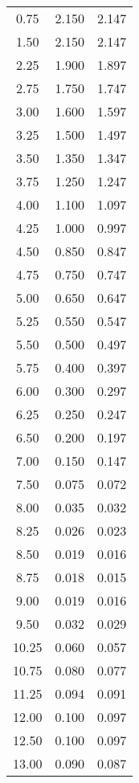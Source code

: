 \begin{tabular}{S[table-format=2.2]S[table-format=1.3]S[table-format=1.3]}
		0.75 & 2.150 & 2.147 \\
		1.50 & 2.150 & 2.147 \\
		2.25 & 1.900 & 1.897 \\
		2.75 & 1.750 & 1.747 \\
		3.00 & 1.600 & 1.597 \\
		3.25 & 1.500 & 1.497 \\
		3.50 & 1.350 & 1.347 \\
		3.75 & 1.250 & 1.247 \\
		4.00 & 1.100 & 1.097 \\
		4.25 & 1.000 & 0.997 \\
		4.50 & 0.850 & 0.847 \\
		4.75 & 0.750 & 0.747 \\
		5.00 & 0.650 & 0.647 \\
		5.25 & 0.550 & 0.547 \\
		5.50 & 0.500 & 0.497 \\
		5.75 & 0.400 & 0.397 \\
		6.00 & 0.300 & 0.297 \\
		6.25 & 0.250 & 0.247 \\
		6.50 & 0.200 & 0.197 \\
		7.00 & 0.150 & 0.147 \\
		7.50 & 0.075 & 0.072 \\
		8.00 & 0.035 & 0.032 \\
		8.25 & 0.026 & 0.023 \\
		8.50 & 0.019 & 0.016 \\
		8.75 & 0.018 & 0.015 \\
		9.00 & 0.019 & 0.016 \\
		9.50 & 0.032 & 0.029 \\
		10.25 & 0.060 & 0.057 \\
		10.75 & 0.080 & 0.077 \\
		11.25 & 0.094 & 0.091 \\
		12.00 & 0.100 & 0.097 \\
		12.50 & 0.100 & 0.097 \\
		13.00 & 0.090 & 0.087 \\
		\bottomrule
	\end{tabular}

